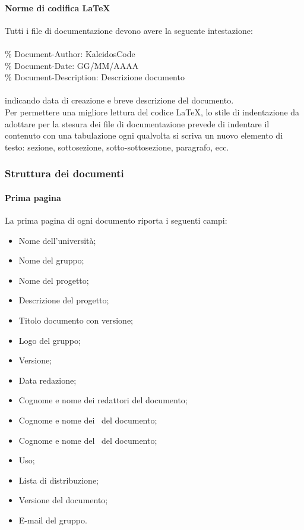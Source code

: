 \documentclass[../NormeDiProgetto.tex]{subfiles}
\begin{document}
				\paragraph{Norme di codifica \LaTeX \\}
					Tutti i file di documentazione devono avere la seguente intestazione:\\
					\\
					\% Document-Author: KaleidosCode\\
					\% Document-Date: GG/MM/AAAA\\
					\% Document-Description: Descrizione documento\\
					\\
					indicando data di creazione e breve descrizione del documento.\\
					Per permettere una migliore lettura del codice \LaTeX, lo stile di indentazione da
					adottare per la stesura dei file di documentazione prevede di indentare il contenuto
					con una tabulazione ogni qualvolta si scriva un nuovo elemento di testo: sezione,
					sottosezione, sotto-sottosezione, paragrafo, ecc.\\
			\subsubsection{Struttura dei documenti}
				\paragraph{Prima pagina\\}
					La prima pagina di ogni documento riporta i seguenti campi:
					\begin{itemize}
						\item Nome dell'università;
						\item Nome del gruppo;
						\item Nome del progetto;
						\item Descrizione del progetto;
						\item Titolo documento con versione;
						\item Logo del gruppo;
						\item Versione;
						\item Data redazione;
						\item Cognome e nome dei redattori del documento;
						\item Cognome e nome dei \verificatori\ del documento;
						\item Cognome e nome del \responsabilediprogetto\ del documento;
						\item Uso;
						\item Lista di distribuzione;
						\item Versione del documento;
						\item E-mail del gruppo.
					\end{itemize} 
\end{document}
